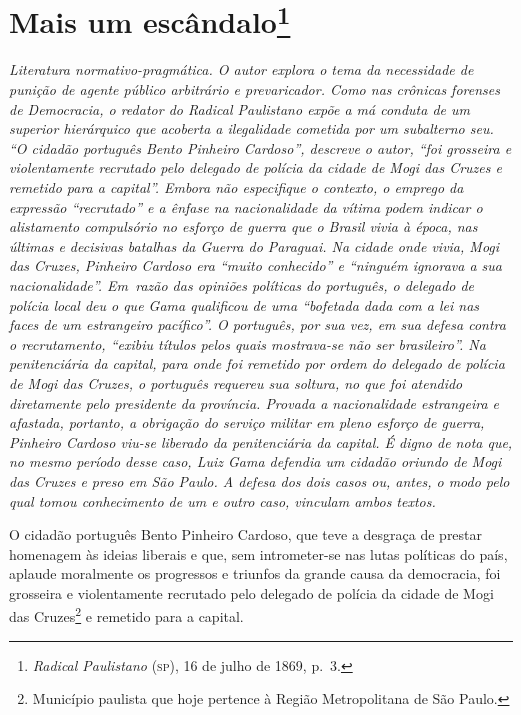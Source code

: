 \chapter{Mais um escândalo\footnote{\emph{Radical Paulistano} (\textsc{sp}),
  16 de julho de 1869, p.~3.}}

\begin{didascalia}\itshape
Literatura normativo-pragmática. O autor explora o tema da necessidade
de punição de agente público arbitrário e prevaricador. Como nas
crônicas forenses de \textnormal{Democracia}, o redator do \textnormal{Radical Paulistano}
expõe a má conduta de um superior hierárquico que acoberta a
ilegalidade cometida por um subalterno seu. ``O cidadão português Bento
Pinheiro Cardoso'', descreve o autor, ``foi grosseira e violentamente
recrutado pelo delegado de polícia da cidade de Mogi das Cruzes e
remetido para a capital''. Embora não especifique o contexto, o emprego
da expressão ``recrutado'' e a ênfase na nacionalidade da vítima podem
indicar o alistamento compulsório no esforço de guerra que o Brasil
vivia à época, nas últimas e decisivas batalhas da Guerra do Paraguai.
Na cidade onde vivia, Mogi das Cruzes, Pinheiro Cardoso era ``muito
conhecido'' e ``ninguém ignorava a sua nacionalidade''. Em~razão das
opiniões políticas do português, o delegado de polícia local deu o que
Gama qualificou de uma ``bofetada dada com a lei nas faces de um
estrangeiro pacífico''. O português, por sua vez, em sua defesa contra o
recrutamento, ``exibiu títulos pelos quais mostrava-se não ser
brasileiro''. Na penitenciária da capital, para onde foi remetido por
ordem do delegado de polícia de Mogi das Cruzes, o português requereu
sua soltura, no que foi atendido diretamente pelo presidente da
província. Provada a nacionalidade estrangeira e afastada, portanto, a
obrigação do serviço militar em pleno esforço de guerra, Pinheiro
Cardoso viu-se liberado da penitenciária da capital. É digno de nota
que, no mesmo período desse caso, Luiz Gama defendia um cidadão oriundo
de Mogi das Cruzes e preso em São Paulo. A defesa dos dois casos ou,
antes, o modo pelo qual tomou conhecimento de um e outro caso, vinculam
ambos textos.
\end{didascalia}



O cidadão português Bento Pinheiro Cardoso, que teve a desgraça de
prestar homenagem às ideias liberais e que, sem intrometer-se nas lutas
políticas do país, aplaude moralmente os progressos e triunfos da grande
causa da democracia, foi grosseira e violentamente recrutado pelo
delegado de polícia da cidade de Mogi das Cruzes\footnote{Município
  paulista que hoje pertence à Região Metropolitana de São Paulo.} e
remetido para a capital.

